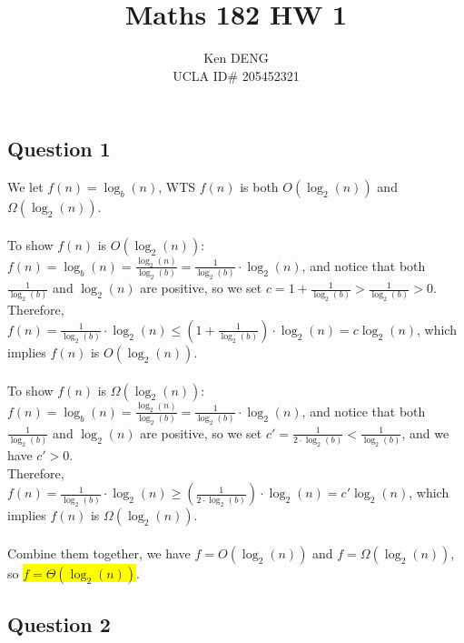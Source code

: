 \documentclass[12pt]{article}
\title{Maths 182 HW 1}
\author{Ken DENG\\ UCLA ID\# 205452321}
\date{}
\begin{document}
\maketitle

\subsection*{Question 1}

We let $f(n) = \log_b(n)$, WTS $f(n)$ is both $O(\log_2(n))$ and $\Omega(\log_2(n))$.\\
\\
To show $f(n)$ is $O(\log_2(n))$: $f(n) = \log_b(n) = \frac{\log_2(n)}{\log_2(b)} = \frac{1}{\log_2(b)}\cdot \log_2(n)$, and notice that both $\frac{1}{\log_2(b)}$ and $\log_2(n)$ are positive, so we set $c = 1 + \frac{1}{\log_2(b)} >  \frac{1}{\log_2(b)} > 0$.\\
Therefore, $f(n) = \frac{1}{\log_2(b)}\cdot \log_2(n) \leq (1 + \frac{1}{\log_2(b)})\cdot \log_2(n) = c \log_2(n)$, which implies $f(n)$ is $O(\log_2(n))$.\\
\\
To show $f(n)$ is $\Omega(\log_2(n))$:  $f(n) = \log_b(n) = \frac{\log_2(n)}{\log_2(b)} = \frac{1}{\log_2(b)}\cdot \log_2(n)$, and notice that both $\frac{1}{\log_2(b)}$ and $\log_2(n)$ are positive, so we set $c' = \frac{1}{2\cdot \log_2(b)} <  \frac{1}{\log_2(b)}$, and we have $c' > 0$.\\
Therefore, $f(n) = \frac{1}{\log_2(b)}\cdot \log_2(n) \geq (\frac{1}{2\cdot\log_2(b)})\cdot \log_2(n) = c' \log_2(n)$, which implies $f(n)$ is $\Omega(\log_2(n))$.\\
\\
Combine them together, we have $f = O(\log_2(n))$ and $f = \Omega(\log_2(n))$, so \colorbox{yellow}{$f = \Theta(\log_2(n))$}.
\par\null\par
\subsection*{Question 2}
\end{document}
